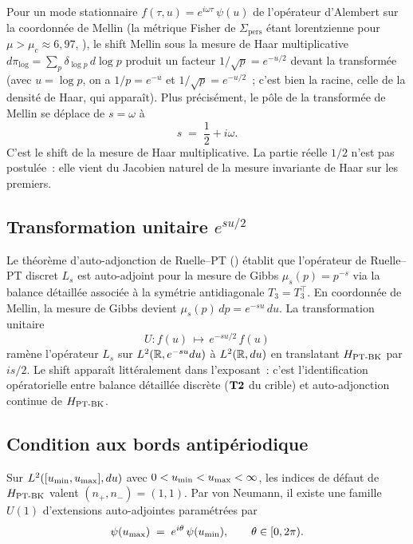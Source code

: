 Pour un mode stationnaire $f(\tau, u) = e^{i\omega\tau}\,\psi(u)$ de
l'opérateur d'Alembert sur la coordonnée de Mellin (la métrique Fisher
de $\Sigma_{\mathrm{pers}}$ étant lorentzienne pour
$\mu > \mu_c \approx 6{,}97$, \cite{PT_GeoSpectral}), le shift Mellin
sous la mesure de Haar multiplicative
$d\pi_{\log} = \sum_p \delta_{\log p}\,d\log p$ produit un facteur
$1/\sqrt{p} = e^{-u/2}$ devant la transformée (avec $u = \log p$, on a
$1/p = e^{-u}$ et $1/\sqrt{p} = e^{-u/2}$~; c'est bien la racine, celle
de la densité de Haar, qui apparaît). Plus précisément, le pôle de la
transformée de Mellin se déplace de $s = \omega$ à
\begin{equation}
\boxed{\;s \;=\; \dfrac{1}{2} + i\omega.\;}
\label{eq:haar_shift}
\end{equation}
C'est le shift de la mesure de Haar multiplicative. La partie réelle
$1/2$ n'est pas postulée~: elle vient du Jacobien naturel de la mesure
invariante de Haar sur les premiers.

\subsection{Transformation unitaire $e^{su/2}$}
\label{sec:transformation_unitaire}

Le théorème d'auto-adjonction de Ruelle--PT (\cite{PT_Foundations})
établit que l'opérateur de Ruelle--PT discret $L_s$ est auto-adjoint pour
la mesure de Gibbs $\mu_s(p) = p^{-s}$ via la balance détaillée associée
à la symétrie antidiagonale $T_3 = T_3^{\top}$. En coordonnée de Mellin,
la mesure de Gibbs devient $\mu_s(p)\,dp = e^{-su}\,du$. La transformation
unitaire
\begin{equation}
U : f(u) \,\mapsto\, e^{-su/2}\,f(u)
\label{eq:U_unitaire}
\end{equation}
ramène l'opérateur $L_s$ sur $L^{2}(\mathbb{R}, e^{-su} du)$ à
$L^{2}(\mathbb{R}, du)$ en translatant $H_{\mathrm{PT\text{-}BK}}$ par $is/2$. Le shift apparaît
littéralement dans l'exposant~: c'est l'identification opératorielle
entre balance détaillée discrète ($\textbf{T2}$ du crible) et auto-adjonction
continue de $H_{\mathrm{PT\text{-}BK}}$.

\subsection{Condition aux bords antipériodique}
\label{sec:bord_antiperiodique}

Sur $L^{2}([u_{\min}, u_{\max}], du)$ avec $0 < u_{\min} < u_{\max} < \infty$, les
indices de défaut de $H_{\mathrm{PT\text{-}BK}}$ valent $(n_+, n_-) = (1, 1)$. Par von
Neumann, il existe une famille $U(1)$ d'extensions auto-adjointes
paramétrées par
\begin{equation}
\psi(u_{\max}) \;=\; e^{i\theta}\,\psi(u_{\min}), \qquad \theta \in [0, 2\pi).
\label{eq:BC_general}
\end{equation}

